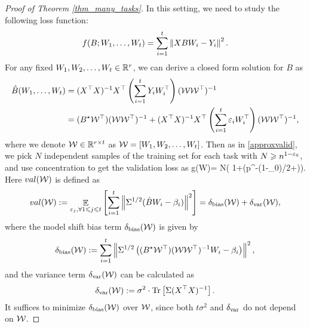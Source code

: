 \begin{proof}[Proof of Theorem \ref{thm_many_tasks}]
In this setting, we need to study the following loss function:
\begin{align}
	f(B; W_1, \dots, W_t) = \sum_{i=1}^t \bignorm{X B W_i - Y_i}^2. \label{eq_mtl_same_cov}
\end{align}
For any fixed $W_1, W_2, \dots, W_t \in \R^r$, we can derive a closed form solution for $B$ as
	\begin{align*}
		\hat{B}(W_1, \dots, W_t) &= (X^{\top}X)^{-1} X^{\top} \bigbrace{\sum_{i=1}^t Y_i W_i^{\top}} (\cal W  \cal W^{\top})^{-1} \\
		&= (B^\star \cal W ^{\top}) (\cal W \cal W ^{\top})^{-1} + (X^{\top}X)^{-1}X^{\top} \bigbrace{\sum_{i=1}^t \varepsilon_i W_i^{\top}} (\cal W \cal W^{\top})^{-1},
	\end{align*}
	where we denote $\cal W \in\real^{r\times t}$ as $\cal W=[W_1, W_2, \dots, W_t]$.
Then as in \eqref{approxvalid}, we pick $N$ independent samples of the training set for each task with $N\ge n^{1-\e_0}$, and use concentration to get the validation loss as
\be\label{eq_multival}g(\cal W)=  N\cdot \left( 1+\OO(p^{-(1-\e_0)/2+\e})\right).\ee
Here $\val(\cal W)$ is defined as
	$$\val( \cal W):=\exarg{\varepsilon_j, \forall 1\le j\le t}{ \sum_{i=1}^t \bignorm{\Sigma^{1/2}( \hat B W_i - \beta_i)}^2} =  \delta_{\bias}(\cal W) + \delta_{\vari}(\cal W),$$
where the model shift bias term $\delta_{\bias}(\cal W) $ is given by
	\begin{align*}
		\delta_{\bias}(\cal W) :=\sum_{i=1}^t  \bignorm{\Sigma^{1/2}\bigbrace{(B^\star \cal W^\top) (\cal W\cal W^{\top})^{-1} W_i - \beta_i}}^2,
	\end{align*}
	and the variance term $\delta_{\vari}(\cal W)$ can be calculated as
	\begin{align*}
		\delta_{\vari}(\cal W):= \sigma^2 \cdot \bigtr{\Sigma (X^{\top}X)^{-1}}.
	\end{align*}
It suffices to minimize $\delta_{\bias}(\cal W)$ over $\cal W$, since both $t \sigma^2$ and $\delta_{\vari}$ do not depend on $\cal W$.


\end{proof}
